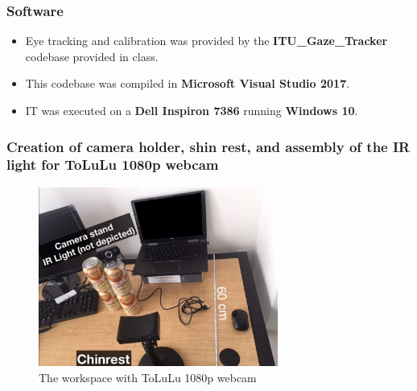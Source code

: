 \documentclass{beamer}
\begin{document}
    \begin{frame}
        \frametitle{Software}

        \begin{itemize}
            \item Eye tracking and calibration was provided by the
            \textbf{ITU\_Gaze\_Tracker} codebase provided in class.
            \item This codebase was compiled in \textbf{Microsoft Visual Studio
            2017}.
            \item IT was executed on a \textbf{Dell Inspiron 7386} running
            \textbf{Windows 10}.
        \end{itemize}

    \end{frame}

    \begin{frame}
        \frametitle{Creation of camera holder, shin rest, and assembly of the
        IR light for ToLuLu 1080p webcam}

        \begin{figure}
            \begin{center}
                \includegraphics[width=0.7\textwidth]{Work_space_Tolulu.jpg}
            \end{center}
            \caption{The workspace with ToLuLu 1080p webcam}
            \label{fig:Workspace_Tolulu}
        \end{figure}

    \end{frame}
\end{document}
